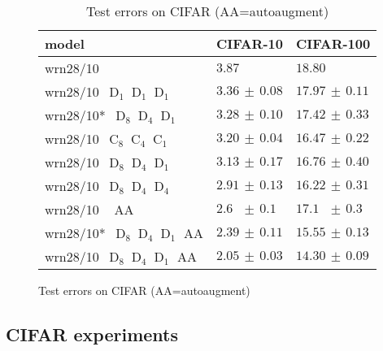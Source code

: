 \documentclass{article}
\newcommand{\D}[1]{\ensuremath{\operatorname{D}_{#1}}}
\newcommand{\C}[1]{\ensuremath{\operatorname{C}_{#1}}}
\newlength{\secBefore}
\newlength{\secAfter}
\newlength{\subsecBefore}
\newlength{\subsecAfter}
\begin{document}
\begin{figure}
\begin{minipage}{\linewidth}
\begin{minipage}{0.52\linewidth}
\begin{table}[H]
{\begin{tabular}{lll}
        \toprule
        model                         & CIFAR-10                                 & CIFAR-100        \\
        \midrule
        wrn28/10 \hspace{2.7ex} \cite{widenet}
                                            & $3.87$                                   & $18.80$          \\
        wrn28/10\phantom{*}\ $\D1\D1\D1$    & $3.36 \scriptstyle\,\pm\,0.08$           & $17.97 \scriptstyle\,\pm\,0.11$ \\
        wrn28/10*\           $\D8\D4\D1$    & $3.28 \scriptstyle\,\pm\,0.10$           & $17.42 \scriptstyle\,\pm\,0.33$ \\
        wrn28/10\phantom{*}\ $\C8\C4\C1$    & $3.20 \scriptstyle\,\pm\,0.04$           & $16.47 \scriptstyle\,\pm\,0.22$ \\
        wrn28/10\phantom{*}\ $\D8\D4\D1$    & $3.13 \scriptstyle\,\pm\,0.17$           & $16.76 \scriptstyle\,\pm\,0.40$ \\
        wrn28/10\phantom{*}\ $\D8\D4\D4$    & $2.91 \scriptstyle\,\pm\,0.13$           & $16.22 \scriptstyle\,\pm\,0.31$ \\
        \midrule
        wrn28/10 \hspace{2.7ex} \ \cite{autoaugment} \hspace{2.15ex} AA
                                      & $2.6\phantom{0} \scriptstyle\,\pm\,0.1$  & $17.1\phantom{0} \scriptstyle\,\pm\,0.3$ \\
        wrn28/10*\           $\D8\D4\D1$ AA  & $2.39 \scriptstyle\,\pm\,0.11$           & $15.55 \scriptstyle\,\pm\,0.13$ \\
        wrn28/10\phantom{*}\ $\D8\D4\D1$ AA  & $2.05 \scriptstyle\,\pm\,0.03$           & $14.30 \scriptstyle\,\pm\,0.09$ \\
        \bottomrule
    \end{tabular}}
    \vspace*{2.5pt}
    \caption{
        Test errors on CIFAR (AA=autoaugment)
    }
    \label{tab:cifar}
    \end{table} 
    \end{minipage}
\end{minipage}
\vspace*{-2ex}
\end{figure}




\vspace*{\subsecBefore}
\subsection{CIFAR experiments}
\label{sec:cifar}
\vspace*{\subsecAfter}
\end{document}
